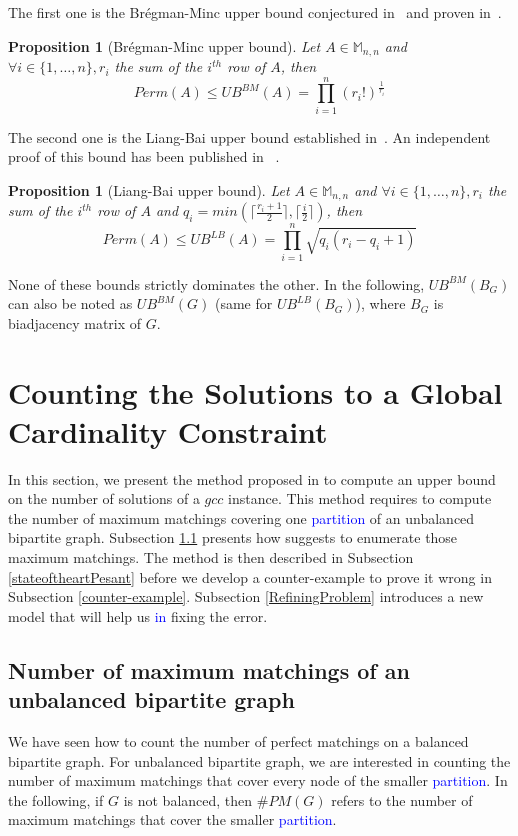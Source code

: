 \documentclass[jair,twoside,11pt,theapa]{article}
\newtheorem{proposition}[theorem]{Proposition}
\newcommand{\minor}[1]{\textcolor{blue}{#1}}
\newcommand{\fromto}[3]{#1 \in \lbrace #2, \ldots, #3 \rbrace}
\newcommand{\perm}[1]{Perm(#1)}
\newcommand{\nbperfectmatching}[1]{\#PM(#1)}
\newcommand{\bregmanmincbound}[1]{UB^{BM}(#1)}
\newcommand{\liangbaibound}[1]{UB^{LB}(#1)}
\begin{document}
	The first one is the Br\'egman-Minc upper bound conjectured in~\cite{Minc63} and proven in~\cite{Bregman73}.
\begin{proposition}[Br\'egman-Minc upper bound]
Let $A \in \mathbb{M}_{n,n}$ and $\forall \fromto{i}{1}{n}, r_i$ the sum of the $i^{th}$ row of $A$, then
\begin{equation}
	\perm{A} \leq \bregmanmincbound{A} = \prod_{i=1}^n (r_i!)^{\frac{1}{r_i}}
\end{equation}
\end{proposition}

The second one is the Liang-Bai upper bound established in~\cite{LiangB04}. An independent proof of this bound has been published in~\cite{Friedland08} .
\begin{proposition}[Liang-Bai upper bound]
Let $A \in \mathbb{M}_{n,n}$ and $\forall \fromto{i}{1}{n}, r_i$ the sum of the $i^{th}$ row of $A$ and $q_i=min(\lceil \frac{r_i+1}{2} \rceil, \lceil \frac{i}{2} \rceil )$, then
\begin{equation}
	\perm{A} \leq \liangbaibound{A} = \prod_{i=1}^n \sqrt {q_i(r_i-q_i+1)}
\end{equation}	
\end{proposition}
 
None of these bounds strictly dominates the other. In the following, $\bregmanmincbound{B_G}$ can also be noted as $\bregmanmincbound{G}$ (same for $\liangbaibound{B_G}$), where $B_G$ is biadjacency matrix of $G$.


\section{Counting the Solutions to a Global Cardinality Constraint}
\label{errorStateoftheart}

In this section, we present the method proposed in \cite{PesantQZ12} to compute an upper bound on the number of solutions of a $gcc$ instance. This method requires to compute the number of maximum matchings covering one \minor{partition} of an unbalanced bipartite graph. Subsection \ref{unbalancedbipartitegraph} presents how \cite{PesantQZ12} suggests to enumerate those maximum matchings. The method is then described in Subsection \ref{stateoftheartPesant} before we develop a counter-example to prove it wrong in Subsection \ref{counter-example}. Subsection \ref{RefiningProblem} introduces a new model that will help us \minor{in} fixing the error. 


\subsection{Number of maximum matchings of an unbalanced bipartite graph}
\label{unbalancedbipartitegraph}
We have seen how to count the number of perfect matchings on a balanced bipartite graph. For unbalanced bipartite graph, we are interested in counting the number of maximum matchings that cover every node of the smaller \minor{partition}. In the following, if $G$ is not balanced, then $\nbperfectmatching{G}$ refers to the number of maximum matchings that cover the smaller \minor{partition}.
\end{document}

